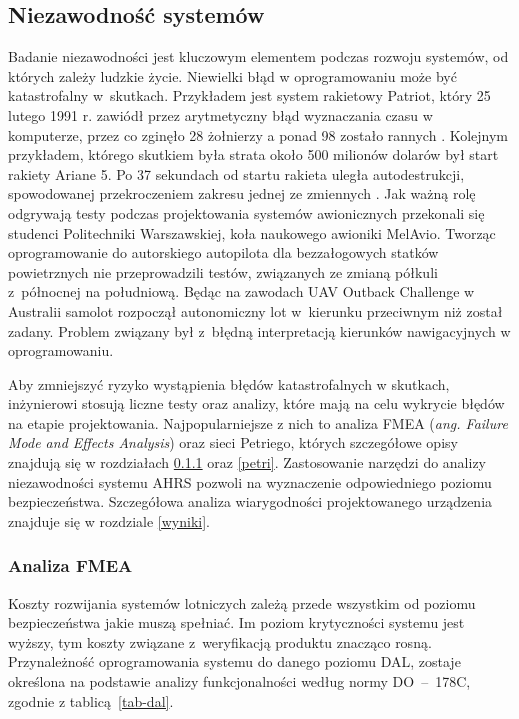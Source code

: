 \documentclass[a4paper, 12pt, twoside]{article}
\begin{document}
\subsection{Niezawodność systemów}

Badanie niezawodności jest kluczowym elementem podczas rozwoju systemów, od których zależy ludzkie życie. Niewielki błąd w oprogramowaniu może być katastrofalny w~skutkach. Przykładem jest system rakietowy Patriot, który 25 lutego 1991 r. zawiódł przez arytmetyczny błąd wyznaczania czasu w komputerze, przez co zginęło 28 żołnierzy a ponad 98 zostało rannych \cite{catastrophes}. Kolejnym przykładem, którego skutkiem była strata około 500 milionów dolarów był start rakiety Ariane 5. Po 37 sekundach od startu rakieta uległa autodestrukcji, spowodowanej przekroczeniem zakresu jednej ze zmiennych \cite{catastrophes}. Jak ważną rolę odgrywają testy podczas projektowania systemów awionicznych przekonali się studenci Politechniki Warszawskiej, koła naukowego awioniki MelAvio. Tworząc oprogramowanie do autorskiego autopilota dla bezzałogowych statków powietrznych nie przeprowadzili testów, związanych ze zmianą półkuli z~północnej na południową. Będąc na zawodach UAV Outback Challenge w Australii samolot rozpoczął autonomiczny lot w~kierunku przeciwnym niż został zadany. Problem związany był z~błędną interpretacją kierunków nawigacyjnych w oprogramowaniu.

Aby zmniejszyć ryzyko wystąpienia błędów katastrofalnych w skutkach, inżynierowi stosują liczne testy oraz analizy, które mają na celu wykrycie błędów na etapie projektowania. Najpopularniejsze z nich to analiza FMEA  (\textit{ang. Failure Mode and Effects Analysis}) oraz sieci Petriego, których szczegółowe opisy znajdują się w rozdziałach \ref{fmea} oraz \ref{petri}. Zastosowanie narzędzi do analizy niezawodności systemu AHRS pozwoli na wyznaczenie odpowiedniego poziomu bezpieczeństwa. Szczegółowa analiza wiarygodności projektowanego urządzenia znajduje się w rozdziale \ref{wyniki}.


\subsubsection{Analiza FMEA} \label{fmea}
Koszty rozwijania systemów lotniczych zależą przede wszystkim od poziomu bezpieczeństwa jakie muszą spełniać. Im poziom krytyczności systemu jest wyższy, tym koszty związane z~weryfikacją produktu znacząco rosną. Przynależność oprogramowania systemu do danego poziomu DAL, zostaje określona na podstawie analizy funkcjonalności według normy DO~--~178C, zgodnie z tablicą~\ref{tab-dal}.
\end{document}
